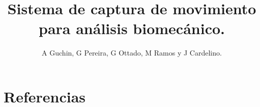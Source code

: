 \documentclass[a4paper]{jpconf}
\begin{document}
\title{Sistema de captura de movimiento para análisis biomecánico.}

\author{A Guchin, G Pereira, G Ottado, M Ramos y J Cardelino.}

\address{Instituto de Ingenier\'ia El\'ectrica, Facultad de Ingeniería, Universidad de la Rep\'ublica, Uruguay.}












\section*{Referencias}


\end{document}
